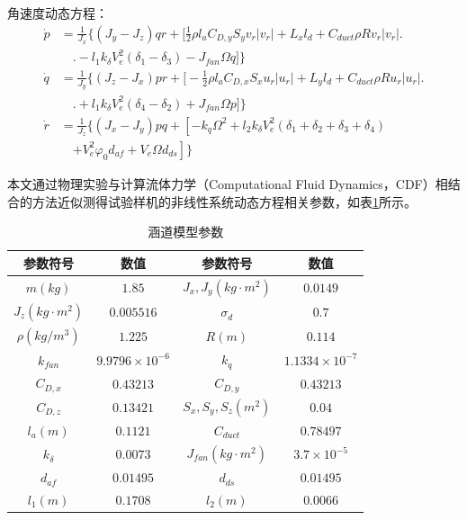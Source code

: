 角速度动态方程：
\begin{equation}
    \begin{aligned}
        \dot{p}  &=\frac{1}{J_x}\Bigg\{ (J_y-J_z)qr+
        \bigg[\frac{1}{2}\rho{l_a} C_{D,y}S_yv_r|v_r|+L_xl_d+C_{duct}\rho{R}
        v_r|v_r| \bigg.\\
        & \quad\bigg.- l_1k_\delta V_e^2(\delta_1 - \delta_3)-J_{fan}\Omega{q}\bigg]\Bigg\} \\
        \dot{q}  &=\frac{1}{J_y}\Bigg\{ (J_z-J_x)pr+
        \bigg[-\frac{1}{2}\rho{l_a} C_{D,x}S_xu_r|u_r|+L_yl_d+C_{duct}\rho{R}
        u_r|u_r| \bigg.\\
        & \quad\bigg.+ l_1k_\delta V_e^2(\delta_4 - \delta_2)+J_{fan}\Omega{p}\bigg]\Bigg\} \\
        \dot{r}  &=\frac{1}{J_z}\Bigg\{ (J_x-J_y)pq+
        \left[-k_q\Omega^2 +l_2k_\delta V_e^2(\delta_1 + \delta_2 + \delta_3 + \delta_4)\right.\\
        & \quad\left.+V_e^2\varphi_0d_{af}+V_e\Omega{d_{ds}}\right]
        \Bigg\}
    \end{aligned}
    \label{eq_43}
\end{equation}

本文通过物理实验与计算流体力学（Computational Fluid Dynamics，CDF）相结合的方法近似测得试验样机的非线性系统动态方程相关参数，如表\ref{DFUAV_parameters}所示。

\begin{table}
	\caption{\label{DFUAV_parameters}涵道模型参数}
	\centering
	\small 
	\begin{tabular}{cccc}
		\hline 
		参数符号 & 数值                & 参数符号 & 数值                 \tabularnewline
		\hline 
		$m(kg)$   & $1.85$ 		     & $J_x,J_y(kg\cdot{m}^2)$   & $0.0149         $ \tabularnewline
		$J_z(kg\cdot{m}^2)$   & $0.005516$ & $\sigma_d$   & $0.7$ \tabularnewline
        $\rho(kg/m^3)$   & $1.225$ & $R(m)$   & $0.114$ \tabularnewline
        $k_{fan}$   & $9.9796\times10^{-6}$ & $k_q$   & $1.1334\times10^{-7}$ \tabularnewline
        $C_{D,x}$   & $0.43213$ & $C_{D,y}$   & $0.43213$ \tabularnewline
        $C_{D,z}$   & $0.13421$ & $S_x,S_y,S_z(m^2)$   & $0.04$ \tabularnewline
        $l_a(m)$   & $0.1121$ & $C_{duct}$   & $0.78497$ \tabularnewline
        $k_{\delta}$   & $0.0073$ & $J_{fan}(kg\cdot{m}^2)$   & $3.7\times10^{-5}$ \tabularnewline
        $d_{af}$   & $0.01495$ & $d_{ds}$   & $0.01495$ \tabularnewline
        $l_1(m)$   & $0.1708$ & $l_2(m)$   & $0.0066$ \tabularnewline
		\hline 
	\end{tabular}
\end{table}

